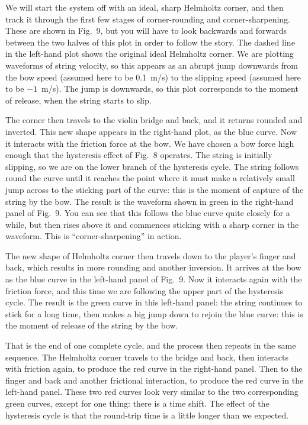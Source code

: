   We will start the system off with an ideal, sharp Helmholtz corner, and then 
  track it through the first few stages of corner-rounding and 
  corner-sharpening. These are shown in Fig.\ 9, but you will have to look 
  backwards and forwards between the two halves of this plot in order to follow 
  the story. The dashed line in the left-hand plot shows the original ideal 
  Helmholtz corner. We are plotting waveforms of string velocity, so this 
  appears as an abrupt jump downwards from the bow speed (assumed here to be 
  0.1~m/s) to the slipping speed (assumed here to be $-1$~m/s). The jump is 
  downwards, so this plot corresponds to the moment of release, when the string 
  starts to slip. 



  The corner then travels to the violin bridge and back, and it returns rounded 
  and inverted. This new shape appears in the right-hand plot, as the blue 
  curve. Now it interacts with the friction force at the bow. We have chosen a 
  bow force high enough that the hysteresis effect of Fig.\ 8 operates. The 
  string is initially slipping, so we are on the lower branch of the hysteresis 
  cycle. The string follows round the curve until it reaches the point where it 
  must make a relatively small jump across to the sticking part of the curve: 
  this is the moment of capture of the string by the bow. The result is the 
  waveform shown in green in the right-hand panel of Fig.\ 9. You can see that 
  this follows the blue curve quite closely for a while, but then rises above 
  it and commences sticking with a sharp corner in the waveform. This is 
  “corner-sharpening” in action. 

  The new shape of Helmholtz corner then travels down to the player’s finger 
  and back, which results in more rounding and another inversion. It arrives at 
  the bow as the blue curve in the left-hand panel of Fig.\ 9. Now it interacts 
  again with the friction force, and this time we are following the upper part 
  of the hysteresis cycle. The result is the green curve in this left-hand 
  panel: the string continues to stick for a long time, then makes a big jump 
  down to rejoin the blue curve: this is the moment of release of the string by 
  the bow. 

  That is the end of one complete cycle, and the process then repeats in the 
  same sequence. The Helmholtz corner travels to the bridge and back, then 
  interacts with friction again, to produce the red curve in the right-hand 
  panel. Then to the finger and back and another frictional interaction, to 
  produce the red curve in the left-hand panel. These two red curves look very 
  similar to the two corresponding green curves, except for one thing: there is 
  a time shift. The effect of the hysteresis cycle is that the round-trip time 
  is a little longer than we expected. 

